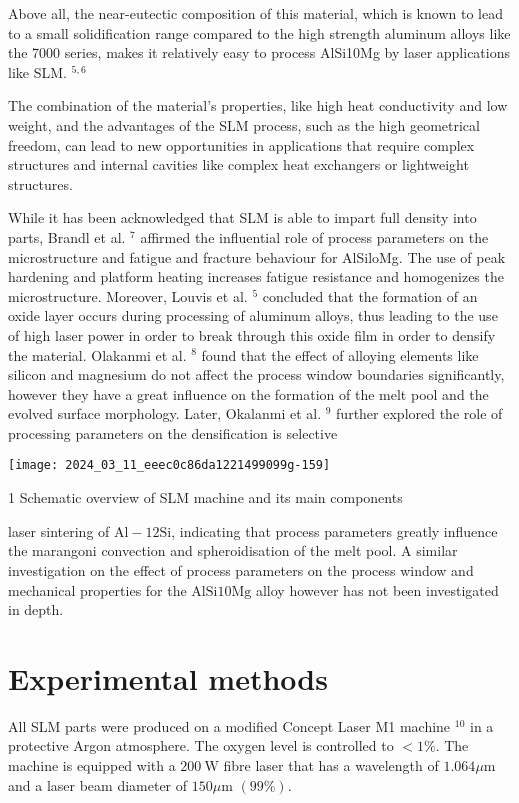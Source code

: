 \documentclass[10pt]{article}
\begin{document}
Above all, the near-eutectic composition of this material, which is known to lead to a small solidification range compared to the high strength aluminum alloys like the 7000 series, makes it relatively easy to process AlSi10Mg by laser applications like SLM. ${ }^{5,6}$

The combination of the material's properties, like high heat conductivity and low weight, and the advantages of the SLM process, such as the high geometrical freedom, can lead to new opportunities in applications that require complex structures and internal cavities like complex heat exchangers or lightweight structures.

While it has been acknowledged that SLM is able to impart full density into parts, Brandl et al. ${ }^{7}$ affirmed the influential role of process parameters on the microstructure and fatigue and fracture behaviour for AlSiloMg. The use of peak hardening and platform heating increases fatigue resistance and homogenizes the microstructure. Moreover, Louvis et al. ${ }^{5}$ concluded that the formation of an oxide layer occurs during processing of aluminum alloys, thus leading to the use of high laser power in order to break through this oxide film in order to densify the material. Olakanmi et al. ${ }^{8}$ found that the effect of alloying elements like silicon and magnesium do not affect the process window boundaries significantly, however they have a great influence on the formation of the melt pool and the evolved surface morphology. Later, Okalanmi et al. ${ }^{9}$ further explored the role of processing parameters on the densification is selective

\begin{center}
\texttt{[image: 2024\_03\_11\_eeec0c86da1221499099g-159]}
\end{center}

1 Schematic overview of SLM machine and its main components

laser sintering of $\mathrm{Al}-12 \mathrm{Si}$, indicating that process parameters greatly influence the marangoni convection and spheroidisation of the melt pool. A similar investigation on the effect of process parameters on the process window and mechanical properties for the $\mathrm{AlSi10Mg}$ alloy however has not been investigated in depth.

\section*{Experimental methods}
All SLM parts were produced on a modified Concept Laser M1 machine ${ }^{10}$ in a protective Argon atmosphere. The oxygen level is controlled to $<1 \%$. The machine is equipped with a $200 \mathrm{~W}$ fibre laser that has a wavelength of $1.064 \mu \mathrm{m}$ and a laser beam diameter of $150 \mu \mathrm{m}$ $(99 \%)$.
\end{document}
